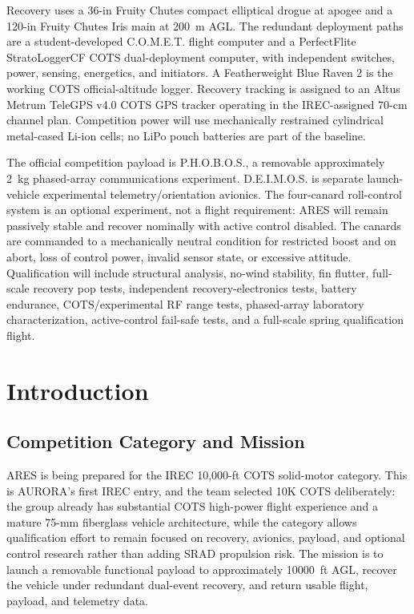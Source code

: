 \documentclass[10pt]{article}
\newcommand{\COMET}{C.O.M.E.T.}
\newcommand{\DEIMOS}{D.E.I.M.O.S.}
\newcommand{\PHOBOS}{P.H.O.B.O.S.}
\begin{document}
Recovery uses a 36-in Fruity Chutes compact elliptical drogue at apogee and a 120-in Fruity Chutes Iris main at \SI{200}{m} AGL. The redundant deployment paths are a student-developed \COMET{} flight computer and a PerfectFlite StratoLoggerCF COTS dual-deployment computer, with independent switches, power, sensing, energetics, and initiators. A Featherweight Blue Raven 2 is the working COTS official-altitude logger. Recovery tracking is assigned to an Altus Metrum TeleGPS v4.0 COTS GPS tracker operating in the IREC-assigned 70-cm channel plan. Competition power will use mechanically restrained cylindrical metal-cased Li-ion cells; no LiPo pouch batteries are part of the baseline.

The official competition payload is \PHOBOS{}, a removable approximately \SI{2}{kg} phased-array communications experiment. \DEIMOS{} is separate launch-vehicle experimental telemetry/orientation avionics. The four-canard roll-control system is an optional experiment, not a flight requirement: ARES will remain passively stable and recover nominally with active control disabled. The canards are commanded to a mechanically neutral condition for restricted boost and on abort, loss of control power, invalid sensor state, or excessive attitude. Qualification will include structural analysis, no-wind stability, fin flutter, full-scale recovery pop tests, independent recovery-electronics tests, battery endurance, COTS/experimental RF range tests, phased-array laboratory characterization, active-control fail-safe tests, and a full-scale spring qualification flight.

\section{Introduction}

\subsection{Competition Category and Mission}
ARES is being prepared for the IREC 10,000-ft COTS solid-motor category. This is AURORA's first IREC entry, and the team selected 10K COTS deliberately: the group already has substantial COTS high-power flight experience and a mature 75-mm fiberglass vehicle architecture, while the category allows qualification effort to remain focused on recovery, avionics, payload, and optional control research rather than adding SRAD propulsion risk. The mission is to launch a removable functional payload to approximately \SI{10000}{ft} AGL, recover the vehicle under redundant dual-event recovery, and return usable flight, payload, and telemetry data.
\end{document}
